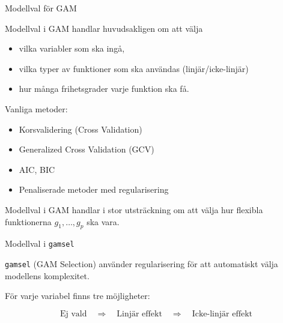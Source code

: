 \documentclass[10pt,english]{beamer}
\begin{document}
\begin{frame}{Modellval för GAM}

    Modellval i GAM handlar huvudsakligen om att välja

    \begin{itemize}
        \item vilka variabler som ska ingå,
        \item vilka typer av funktioner som ska användas (linjär/icke-linjär)
        \item hur många frihetsgrader varje funktion ska få.
    \end{itemize}

    \medskip

    Vanliga metoder:

    \begin{itemize}
        \item Korsvalidering (Cross Validation)
        \item Generalized Cross Validation (GCV)
        \item AIC, BIC
        \item Penaliserade metoder med regularisering
    \end{itemize}

    \medskip

    \begin{greenbox}
        Modellval i GAM handlar i stor utsträckning om att välja
        hur flexibla funktionerna \(g_1,\ldots,g_p\) ska vara.
    \end{greenbox}

\end{frame}




\begin{frame}{Modellval i \texttt{gamsel}}

    \texttt{gamsel} (GAM Selection) använder regularisering för att
    automatiskt välja modellens komplexitet.

    \medskip

    För varje variabel finns tre möjligheter:

    \[
        \text{Ej vald}
        \quad\Longrightarrow\quad
        \text{Linjär effekt}
        \quad\Longrightarrow\quad
        \text{Icke-linjär effekt}
    \]



\end{frame}
\end{document}
